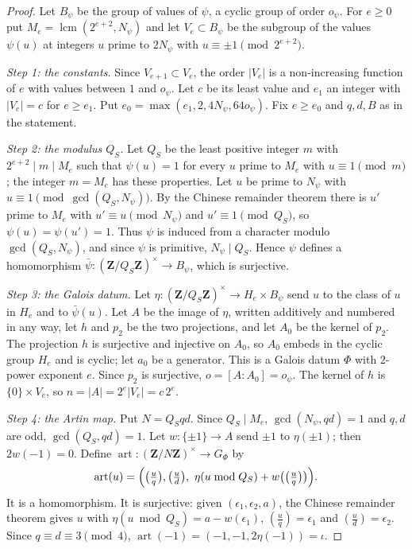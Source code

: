 \begin{proof}
Let $B_\psi$ be the group of values of $\psi$, a cyclic group of order $o_\psi$. For $e\geq0$ put
$M_e=\operatorname{lcm}(2^{e+2},N_\psi)$ and let $V_e\subset B_\psi$ be the subgroup of the values
$\psi(u)$ at integers $u$ prime to $2N_\psi$ with $u\equiv\pm1\pmod{2^{e+2}}$.

\emph{Step 1: the constants.} Since $V_{e+1}\subset V_e$, the order $|V_e|$ is a non-increasing
function of $e$ with values between $1$ and $o_\psi$. Let $c$ be its least value and $e_1$ an
integer with $|V_e|=c$ for $e\geq e_1$. Put $e_0=\max(e_1,2,4N_\psi,64o_\psi)$. Fix $e\geq e_0$
and $q,d,B$ as in the statement.

\emph{Step 2: the modulus $Q_S$.} Let $Q_S$ be the least positive integer $m$ with
$2^{e+2}\mid m\mid M_e$ such that $\psi(u)=1$ for every $u$ prime to $M_e$ with $u\equiv1\pmod m$;
the integer $m=M_e$ has these properties. Let $u$ be prime to $N_\psi$ with
$u\equiv1\pmod{\gcd(Q_S,N_\psi)}$. By the Chinese remainder theorem there is $u'$ prime to $M_e$
with $u'\equiv u\pmod{N_\psi}$ and $u'\equiv1\pmod{Q_S}$, so $\psi(u)=\psi(u')=1$. Thus $\psi$ is
induced from a character modulo $\gcd(Q_S,N_\psi)$, and since $\psi$ is primitive,
$N_\psi\mid Q_S$. Hence $\psi$ defines a homomorphism $\bar\psi\colon(\mathbf Z/Q_S\mathbf Z)^\times\to
B_\psi$, which is surjective.

\emph{Step 3: the Galois datum.} Let $\eta\colon(\mathbf Z/Q_S\mathbf Z)^\times\to H_e\times B_\psi$
send $u$ to the class of $u$ in $H_e$ and to $\bar\psi(u)$. Let $A$ be the image of $\eta$, written
additively and numbered in any way, let $h$ and $p_2$ be the two projections, and let $A_0$ be the
kernel of $p_2$. The projection $h$ is surjective and injective on $A_0$, so $A_0$ embeds in the
cyclic group $H_e$ and is cyclic; let $a_0$ be a generator. This is a Galois datum $\Phi$ with
$2$-power exponent $e$. Since $p_2$ is surjective, $o=[A:A_0]=o_\psi$. The kernel of $h$ is
$\{0\}\times V_e$, so $n=|A|=2^e|V_e|=c\,2^e$.

\emph{Step 4: the Artin map.} Put $N=Q_Sqd$. Since $Q_S\mid M_e$, $\gcd(N_\psi,qd)=1$ and $q,d$
are odd, $\gcd(Q_S,qd)=1$. Let $w\colon\{\pm1\}\to A$ send $\pm1$ to $\eta(\pm1)$; then
$2w(-1)=0$. Define $\operatorname{art}\colon(\mathbf Z/N\mathbf Z)^\times\to G_\Phi$ by
\[
 \operatorname{art}(u)=\Bigl(\bigl(\tfrac uq\bigr),\bigl(\tfrac ud\bigr),\
 \eta(u\bmod Q_S)+w\bigl(\bigl(\tfrac uq\bigr)\bigr)\Bigr).
\]
It is a homomorphism. It is surjective: given $(\epsilon_1,\epsilon_2,a)$, the Chinese remainder
theorem gives $u$ with $\eta(u\bmod Q_S)=a-w(\epsilon_1)$, $\left(\frac uq\right)=\epsilon_1$ and
$\left(\frac ud\right)=\epsilon_2$. Since $q\equiv d\equiv3\pmod4$,
$\operatorname{art}(-1)=(-1,-1,2\eta(-1))=\iota$.


\end{proof}
